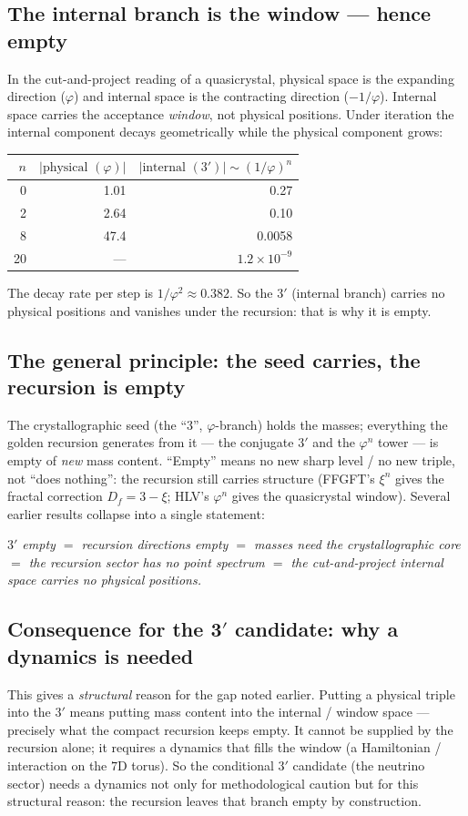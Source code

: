 \subsection{The internal branch is the window --- hence empty}
In the cut-and-project reading of a quasicrystal, physical space is the expanding direction
($\varphi$) and internal space is the contracting direction ($-1/\varphi$). Internal space
carries the acceptance \emph{window}, not physical positions. Under iteration the internal
component decays geometrically while the physical component grows:
\begin{center}\small
\begin{tabular}{@{}r r r@{}}
\toprule
$n$ & $|\text{physical }(\varphi)|$ & $|\text{internal }(3')|\sim(1/\varphi)^n$ \\
\midrule
0 & 1.01 & 0.27 \\
2 & 2.64 & 0.10 \\
8 & 47.4 & 0.0058 \\
20 & --- & $1.2\times10^{-9}$ \\
\bottomrule
\end{tabular}
\end{center}
\noindent The decay rate per step is $1/\varphi^2\approx0.382$. So the $3'$ (internal branch)
carries no physical positions and vanishes under the recursion: that is why it is empty.

\subsection{The general principle: the seed carries, the recursion is empty}
The crystallographic seed (the \enquote{$3$}, $\varphi$-branch) holds the masses; everything the
golden recursion generates from it --- the conjugate $3'$ and the $\varphi^n$ tower --- is empty
of \emph{new} mass content. \enquote{Empty} means no new sharp level / no new triple, not
\enquote{does nothing}: the recursion still carries structure (FFGFT's $\xi^n$ gives the fractal
correction $D_f=3-\xi$; HLV's $\varphi^n$ gives the quasicrystal window). Several earlier
results collapse into a single statement:
\begin{center}\emph{$3'$ empty $=$ recursion directions empty $=$ masses need the crystallographic
core $=$ the recursion sector has no point spectrum $=$ the cut-and-project internal space
carries no physical positions.}\end{center}

\subsection{Consequence for the 3$'$ candidate: why a dynamics is needed}
This gives a \emph{structural} reason for the gap noted earlier. Putting a physical triple into
the $3'$ means putting mass content into the internal / window space --- precisely what the
compact recursion keeps empty. It cannot be supplied by the recursion alone; it requires a
dynamics that fills the window (a Hamiltonian / interaction on the $7$D torus). So the
conditional $3'$ candidate (the neutrino sector) needs a dynamics not only for methodological
caution but for this structural reason: the recursion leaves that branch empty by construction.

